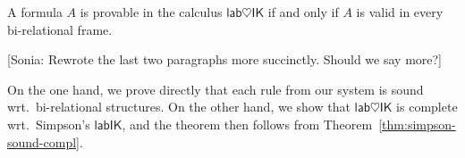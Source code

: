 \documentclass[twoside]{aiml18}
\newcommand{\sonia}[1]{{\color{blue}[Sonia: #1]}}
\newcommand*{\lab}{\mathsf{lab}}
\newcommand*{\IK}{\mathsf{IK}}
\begin{document}
\begin{theorem}
\label{thm:sound-compl}
	A formula $A$ is provable in the calculus $\lab\heartsuit\IK$ if and only if $A$ is valid in every bi-relational frame.
\end{theorem}

\sonia{Rewrote the last two paragraphs more succinctly. Should we say more?}

On the one hand, we prove directly that each rule from our system is sound wrt.~bi-relational structures.
%
On the other hand, we show that $\lab\heartsuit\IK$ is complete wrt.~Simpson's $\lab\IK$, and the theorem then follows from Theorem~\ref{thm:simpson-sound-compl}.

%
%
%
%
%
\end{document}

